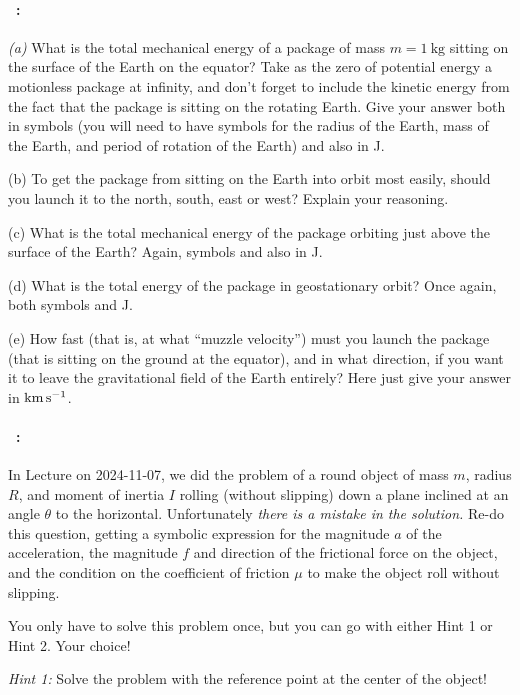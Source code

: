 \documentclass[12pt]{article}
\begin{document}
\paragraph{\problemname~\theproblem:}\label{rocket}%
\textsl{(a)} What is the total mechanical energy of a package of mass
$m= 1~\mathrm{kg}$ sitting on the surface of the Earth on the equator?
Take as the zero of potential energy a motionless package at infinity,
and don't forget to include the kinetic energy from the fact that the
package is sitting on the rotating Earth.  Give your answer both in
symbols (you will need to have symbols for the radius of the Earth,
mass of the Earth, and period of rotation of the Earth) and also in J.

(b) To get the package from sitting on the Earth into orbit most
easily, should you launch it to the north, south, east or west?
Explain your reasoning.

(c) What is the total mechanical energy of the package orbiting just
above the surface of the Earth? Again, symbols and also in J.

(d) What is the total energy of the package in geostationary
orbit? Once again, both symbols and J.

(e) How fast (that is, at what ``muzzle velocity'') must you launch
the package (that is sitting on the ground at the equator), and in what direction, if
you want it to leave the gravitational field of the Earth entirely?
Here just give your answer in $\mathrm{km}\,\mathrm{s}^{-1}$.

\paragraph{\problemname~\theproblem:}%
In Lecture on 2024-11-07, we did the problem of a round object of mass $m$, radius $R$,
and moment of inertia $I$ rolling (without slipping) down a plane inclined at an
angle $\theta$ to the horizontal.
Unfortunately \emph{there is a mistake in the solution.}
Re-do this question, getting a symbolic expression for the magnitude $a$ of the acceleration, the
magnitude $f$ and direction of the frictional force on the object,
and the condition on the coefficient of friction $\mu$ to make the object roll without slipping.

You only have to solve this problem once, but you can go with either Hint 1 or Hint 2.
Your choice!

\emph{Hint 1:} Solve the problem with the reference point at the center of the object!
\end{document}
